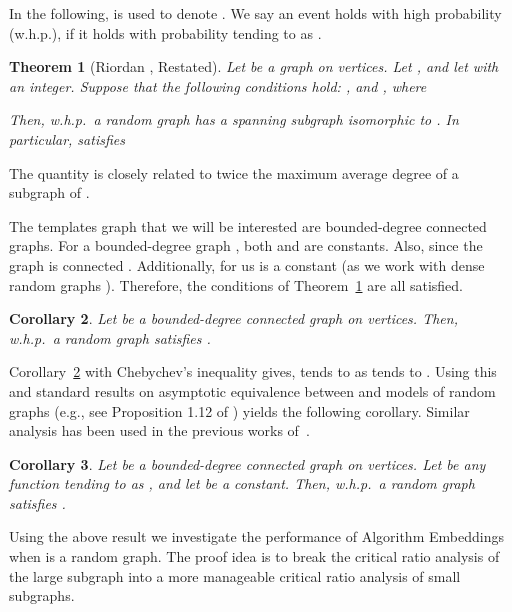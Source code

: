 \documentclass[11pt]{article}
\newtheorem{theorem}{Theorem}[section]
\newtheorem{corollary}[theorem]{Corollary}
\begin{document}
In the following,  is used to denote . We say an event holds with high probability (w.h.p.), if it holds with probability tending to  as .
\begin{theorem}[Riordan \cite{riordan}, Restated] \label{rior}
Let  be a graph on  vertices. Let , and let  with  an integer. Suppose that the following conditions hold: , and  , where  

Then,  w.h.p.\ a random graph  has a spanning subgraph isomorphic to .  In particular,  satisfies

\end{theorem}
The quantity  is closely related to twice the maximum average degree of a subgraph of . 



The templates graph that we will be interested are bounded-degree connected graphs. For a bounded-degree graph , both  and  are constants. Also, since the graph is connected . Additionally, for us  is a constant (as we work with dense random graphs ). Therefore, the conditions of Theorem~\ref{rior} are all satisfied.

\begin{corollary} \label{cor:gnm}
Let  be a bounded-degree connected graph on  vertices. Then,  w.h.p.\ a random graph  satisfies .
\end{corollary} 

Corollary~\ref{cor:gnm} with Chebychev's inequality gives,  tends to  as  tends to . Using this and standard results on asymptotic equivalence between  and  models of random graphs (e.g., see Proposition 1.12 of \cite{jansonr}) yields the following corollary. Similar analysis has been used in the previous works of~\cite{frieze,suen,ras,ras1,chien}.
\begin{corollary} \label{cor:l1}
Let  be a bounded-degree connected graph on  vertices. Let  be any function tending to  as , and let  be a constant. Then,  w.h.p.\ a random graph  satisfies .
\end{corollary}

Using the above result we investigate the performance of Algorithm Embeddings when  is a random graph.
The proof idea is to break the critical ratio analysis of the large subgraph into a more manageable critical ratio analysis of small subgraphs.
\end{document}
